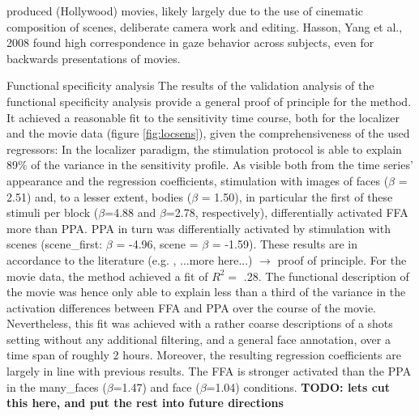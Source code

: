 \documentclass[a4paper, 12pt]{scrreprt}
\begin{document}
produced (Hollywood) movies, likely largely due to the use of cinematic composition of scenes, deliberate camera work and editing. Hasson, Yang et al., 2008 found high correspondence in gaze behavior across subjects, even for backwards presentations of movies.

\bigskip
Functional specificity analysis \newline
The results of the validation analysis of the functional specificity analysis provide a general proof of principle for the method. It achieved a reasonable fit to the sensitivity time course, both for the localizer and the movie data (figure \ref{fig:locsens}), given the comprehensiveness of the used regressors: In the localizer paradigm, the stimulation protocol is able to explain 89\% of the variance in the sensitivity profile. As visible both from the time series' appearance and the regression coefficients, stimulation with images of faces ($\beta$ = 2.51) and, to a lesser extent, bodies ($\beta$ = 1.50), in particular the first of these stimuli per block ($\beta$=4.88 and $\beta$=2.78, respectively), differentially activated FFA more than PPA. PPA in turn was differentially activated by stimulation with scenes (scene\_first: $\beta$ = -4.96, scene = $\beta$ = -1.59). These results are in accordance to the literature (e.g. \cite{fox2009defining}, ...more here...) $\rightarrow$ proof of principle. \newline
For the movie data, the method achieved a fit of $R^2 =$ .28. The functional description of the movie was hence only able to explain less than a third of the variance in the activation differences between FFA and PPA over the course of the movie. Nevertheless, this fit was achieved with a rather coarse descriptions of a shots setting without any additional filtering, and a general face annotation, over a time span of roughly 2 hours. Moreover, the resulting regression coefficients are largely in line with previous results. The FFA is stronger activated than the PPA in the many\_faces ($\beta$=1.47) and face ($\beta$=1.04) conditions. \textbf{TODO: lets cut this here, and put the rest into future directions}
\end{document}
